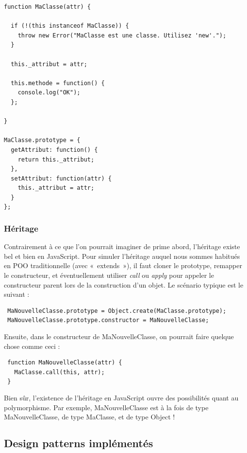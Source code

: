 \documentclass[a4paper,12pt]{article}
\begin{document}
\newpage

\begin{lstlisting}
function MaClasse(attr) {

  if (!(this instanceof MaClasse)) {
    throw new Error("MaClasse est une classe. Utilisez 'new'.");
  }

  this._attribut = attr;
  
  this.methode = function() {
    console.log("OK");
  };
  
}

MaClasse.prototype = {
  getAttribut: function() {
    return this._attribut;
  },
  setAttribut: function(attr) {
    this._attribut = attr;
  }
};
\end{lstlisting}

\subsubsection{Héritage}

Contrairement à ce que l'on pourrait imaginer de prime abord, l'héritage existe bel et bien en JavaScript. Pour simuler l'héritage auquel nous sommes habitués en POO traditionnelle (avec «~extends~»), il faut cloner le prototype, remapper le constructeur, et éventuellement utiliser \textit{call} ou \textit{apply} pour appeler le constructeur parent lors de la construction d'un objet. Le scénario typique est le suivant :

\vspace{7pt}

\begin{lstlisting}
 MaNouvelleClasse.prototype = Object.create(MaClasse.prototype);
 MaNouvelleClasse.prototype.constructor = MaNouvelleClasse;
\end{lstlisting}

Ensuite, dans le constructeur de MaNouvelleClasse, on pourrait faire quelque chose comme ceci :

\vspace{7pt}

\begin{lstlisting}
 function MaNouvelleClasse(attr) {
   MaClasse.call(this, attr);
 }
\end{lstlisting}

Bien sûr, l'existence de l'héritage en JavaScript ouvre des possibilités quant au polymorphisme. Par exemple, MaNouvelleClasse est à la fois de type MaNouvelleClasse, de type MaClasse, et de type Object !

\subsection{Design patterns implémentés}
\end{document}
